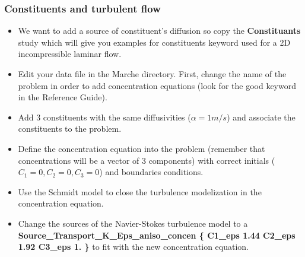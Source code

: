 \documentclass[10pt, hyperref={unicode=true,pdfusetitle, bookmarks=true,bookmarksnumbered=false,bookmarksopen=false, breaklinks=false,pdfborder={0 0 1},backref=true,colorlinks=true,linkcolor=darkblue,pageanchor}]{beamer}
\begin{document}
\begin{frame}
\frametitle{Constituents and turbulent flow}
\begin{block}{}

\begin{itemize}
\item We want to add a source of constituent's diffusion so copy the \textbf{Constituants} study which will give you examples for constituents keyword used for a 2D incompressible laminar flow.

\item Edit your data file in the Marche directory. First, change the name of the problem in order to add concentration equations (look for the good keyword in the Reference Guide).

\item Add 3 constituents with the same diffusivities ($\alpha=1m/s$) and associate the constituents to the problem.

\item Define the concentration equation into the problem (remember that concentrations will be a vector of 3 components) with correct initials ($C_1=0, C_2=0, C_3=0$) and boundaries conditions.

\item Use the Schmidt model to close the turbulence modelization in the  concentration equation.

\item Change the sources of the Navier-Stokes turbulence model to a \textbf{Source\_Transport\_K\_Eps\_aniso\_concen \{ C1\_eps 1.44 C2\_eps 1.92 C3\_eps 1. \} } to fit with the new concentration equation.
\end{itemize}

\end{block}
\end{frame}
\end{document}
